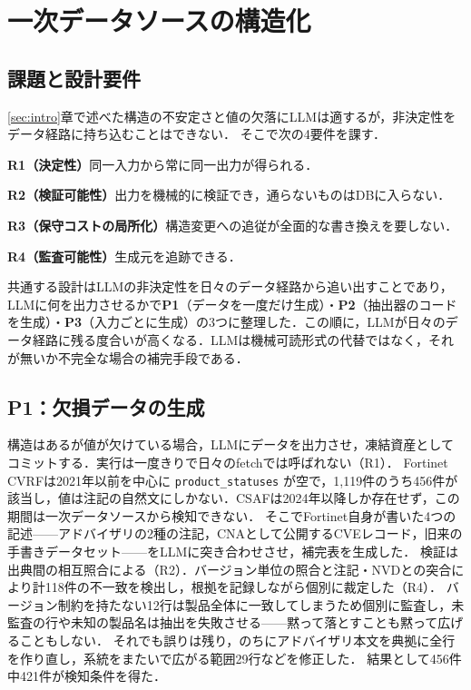 \section{一次データソースの構造化}
\label{sec:llm}

\subsection{課題と設計要件}

\ref{sec:intro}章で述べた構造の不安定さと値の欠落にLLMは適するが，非決定性をデータ経路に持ち込むことはできない．
そこで次の4要件を課す．
\begin{list}{}{%
  \setlength{\leftmargin}{1zw}\setlength{\itemindent}{-1zw}%
  \setlength{\labelwidth}{0pt}\setlength{\labelsep}{0pt}%
  \setlength{\topsep}{2pt}\setlength{\itemsep}{0pt}%
  \setlength{\parsep}{0pt}\setlength{\partopsep}{0pt}}
\item \textbf{R1（決定性）}同一入力から常に同一出力が得られる．
\item \textbf{R2（検証可能性）}出力を機械的に検証でき，通らないものはDBに入らない．
\item \textbf{R3（保守コストの局所化）}構造変更への追従が全面的な書き換えを要しない．
\item \textbf{R4（監査可能性）}生成元を追跡できる．
\end{list}
共通する設計はLLMの非決定性を日々のデータ経路から追い出すことであり，LLMに何を出力させるかで\textbf{P1}（データを一度だけ生成）・\textbf{P2}（抽出器のコードを生成）・\textbf{P3}（入力ごとに生成）の3つに整理した．この順に，LLMが日々のデータ経路に残る度合いが高くなる．LLMは機械可読形式の代替ではなく，それが無いか不完全な場合の補完手段である．

\subsection{P1：欠損データの生成}
\label{sec:p1}

構造はあるが値が欠けている場合，LLMにデータを出力させ，凍結資産としてコミットする．実行は一度きりで日々のfetchでは呼ばれない（R1）．
Fortinet CVRFは2021年以前を中心に \texttt{product\_statuses} が空で，1,119件のうち456件が該当し，値は注記の自然文にしかない．CSAFは2024年以降しか存在せず，この期間は一次データソースから検知できない．
そこでFortinet自身が書いた4つの記述——アドバイザリの2種の注記，CNAとして公開するCVEレコード，旧来の手書きデータセット——をLLMに突き合わせさせ，補完表を生成した\cite{vdu-pr892}．
検証は出典間の相互照合による（R2）．バージョン単位の照合と注記・NVDとの突合により計118件の不一致を検出し，根拠を記録しながら個別に裁定した（R4）．
バージョン制約を持たない12行は製品全体に一致してしまうため個別に監査し，未監査の行や未知の製品名は抽出を失敗させる——黙って落とすことも黙って広げることもしない．
それでも誤りは残り，のちにアドバイザリ本文を典拠に全行を作り直し，系統をまたいで広がる範囲29行などを修正した．
結果として456件中421件が検知条件を得た．

